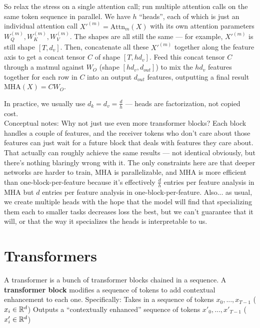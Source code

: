 \documentclass[12pt]{article}
\begin{document}
\begin{outline}
So relax the stress on a single attention call; run multiple attention calls on the same token sequence in parallel.
\1 We have $h$ ``heads'', each of which is just an individual attention call $X'^{(m)} = \text{Attn}_m(X)$ with its own attention parameters $W^{(m)}_Q,W^{(m)}_K,W^{(m)}_V$. The shapes are all still the same --- for example, $X'^{(m)}$ is still shape $[T,d_v]$.
\1 Then, concatenate all these $X'^{(m)}$ together along the feature axis to get a concat tensor $C$ of shape $[T,hd_v]$.
\1 Feed this concat tensor $C$ through a matmul against $W_O$ (shape $[hd_v, d_{out}]$) to mix the $hd_v$ features together for each row in $C$ into an output $d_{out}$ features, outputting a final result $\boxed{\text{MHA}(X) = CW_O}$.
\\\0

In practice, we usually use $\displaystyle d_k=d_v=\frac dh$ --- heads are factorization, not copied cost. \\

Conceptual notes:
\1 Why not just use even more transformer blocks? Each block handles a couple of features, and the receiver tokens who don't care about those features can just wait for a future block that deals with features they care about.
\2 That actually can roughly achieve the same results --- not identical obviously, but there's nothing blaringly wrong with it. The only constraints here are that deeper networks are harder to train, MHA is parallelizable, and MHA is more efficient than one-block-per-feature because it's effectively $\frac dh$ entries per feature analysis in MHA but $d$ entries per feature analysis in one-block-per-feature.
\1 Also... as usual, we create multiple heads with the hope that the model will find that specializing them each to smaller tasks decreases loss the best, but we can't guarantee that it will, or that the way it specializes the heads is interpretable to us.
\0

\section{Transformers}

A transformer is a bunch of transformer blocks chained in a sequence. A \textbf{transformer block} modifies a sequence of tokens to add contextual enhancement to each one. Specifically:
\1 Takes in a sequence of tokens $x_0,...,x_{T-1}$ ($x_i \in \mathbb{R}^d$)
\1 Outputs a ``contextually enhanced'' sequence of tokens $x'_0,...,x'_{T-1}$ ($x'_i \in \mathbb{R}^d$)
\\\0


\end{outline}
\end{document}
